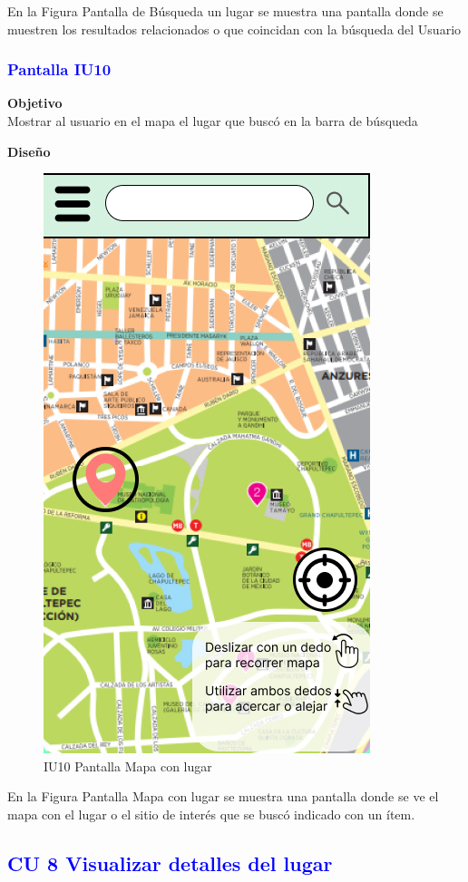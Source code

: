 En la Figura Pantalla de Búsqueda un lugar se muestra una pantalla donde se muestren los resultados relacionados o que coincidan con la búsqueda del Usuario
\newpage

\subsubsection{\textcolor{blue}{Pantalla IU10}}

\textbf{Objetivo} \\
Mostrar al usuario en el mapa el lugar que buscó en la barra de búsqueda
\vspace{15pt}

\textbf{Diseño}
    \begin{figure}[h]
        
            \centering
            \includegraphics[width=.4\linewidth]{Pantallas Prototipo3/IU10 - Mapa principal.jpg}
        \caption{IU10 Pantalla Mapa con lugar}
    
    \end{figure}

En la Figura Pantalla  Mapa con lugar se muestra una pantalla donde se ve el mapa con el lugar o el sitio de interés que se buscó indicado con un ítem.\\
\newpage



\pagebreak
\newpage
\subsection{\textcolor{blue}{CU 8 Visualizar detalles del lugar}}


